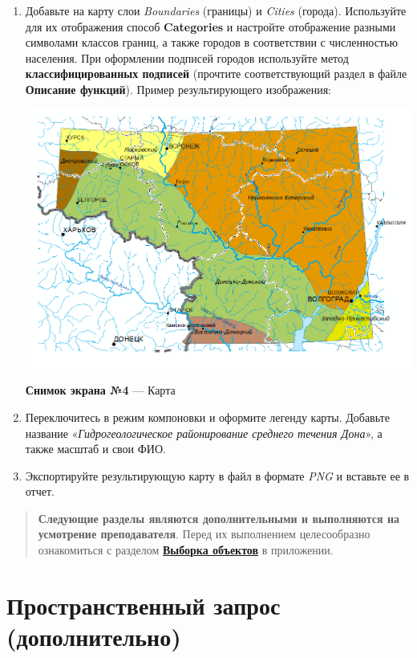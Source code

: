 \documentclass[12pt,]{book}
\begin{document}
\begin{enumerate}
\def\labelenumi{\arabic{enumi}.}
\item
  Добавьте на карту слои \emph{Boundaries} (границы) и \emph{Cities} (города). Используйте для их отображения способ \textbf{Categories} и настройте отображение разными символами классов границ, а также городов в соответствии с численностью населения. При оформлении подписей городов используйте метод \textbf{классифицированных подписей} (прочтите соответствующий раздел в файле \textbf{Описание функций}). Пример результирующего изображения:

  \includegraphics{images/Ex06/image24.png}

  \textbf{Снимок экрана №4} --- Карта
\item
  Переключитесь в режим компоновки и оформите легенду карты. Добавьте название «\emph{Гидрогеологическое районирование среднего течения Дона}», а также масштаб и свои ФИО.
\item
  Экспортируйте результирующую карту в файл в формате \emph{PNG} и вставьте ее в отчет.
\end{enumerate}

\begin{quote}
\textbf{Следующие разделы являются дополнительными и выполняются на усмотрение преподавателя}. Перед их выполнением целесообразно ознакомиться с разделом \textbf{\protect\hyperlink{manual-select}{Выборка объектов}} в приложении.
\end{quote}

\hypertarget{map-ref-hydrogeologic-query}{%
\section{Пространственный запрос (дополнительно)}\label{map-ref-hydrogeologic-query}}
\end{document}
